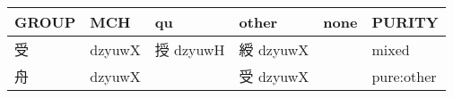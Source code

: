\documentclass[14pt,a4paper]{scrartcl}
\begin{document}
\begin{longtable}[c]{@{}llllll@{}}
\toprule
\begin{minipage}[b]{0.14\columnwidth}\raggedright\strut
GROUP
\strut\end{minipage} &
\begin{minipage}[b]{0.14\columnwidth}\raggedright\strut
MCH
\strut\end{minipage} &
\begin{minipage}[b]{0.14\columnwidth}\raggedright\strut
qu
\strut\end{minipage} &
\begin{minipage}[b]{0.14\columnwidth}\raggedright\strut
other
\strut\end{minipage} &
\begin{minipage}[b]{0.14\columnwidth}\raggedright\strut
none
\strut\end{minipage} &
\begin{minipage}[b]{0.14\columnwidth}\raggedright\strut
PURITY
\strut\end{minipage}\tabularnewline
\midrule
\endhead
\begin{minipage}[t]{0.14\columnwidth}\raggedright\strut
受
\strut\end{minipage} &
\begin{minipage}[t]{0.14\columnwidth}\raggedright\strut
dzyuwX
\strut\end{minipage} &
\begin{minipage}[t]{0.14\columnwidth}\raggedright\strut
授 dzyuwH
\strut\end{minipage} &
\begin{minipage}[t]{0.14\columnwidth}\raggedright\strut
綬 dzyuwX
\strut\end{minipage} &
\begin{minipage}[t]{0.14\columnwidth}\raggedright\strut
\strut\end{minipage} &
\begin{minipage}[t]{0.14\columnwidth}\raggedright\strut
mixed
\strut\end{minipage}\tabularnewline
\begin{minipage}[t]{0.14\columnwidth}\raggedright\strut
舟
\strut\end{minipage} &
\begin{minipage}[t]{0.14\columnwidth}\raggedright\strut
dzyuwX
\strut\end{minipage} &
\begin{minipage}[t]{0.14\columnwidth}\raggedright\strut
\strut\end{minipage} &
\begin{minipage}[t]{0.14\columnwidth}\raggedright\strut
受 dzyuwX
\strut\end{minipage} &
\begin{minipage}[t]{0.14\columnwidth}\raggedright\strut
\strut\end{minipage} &
\begin{minipage}[t]{0.14\columnwidth}\raggedright\strut
pure:other
\strut\end{minipage}\tabularnewline
\bottomrule
\end{longtable}
\end{document}
